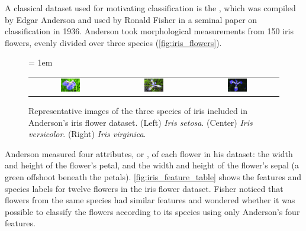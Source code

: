 A classical dataset used for motivating classification is the , which was compiled by Edgar Anderson and used by Ronald Fisher in a seminal paper on classification in 1936. Anderson took morphological measurements from 150 iris flowers, evenly divided over three species (\autoref{fig:iris_flowers}).\\

\begin{figure}[h]
\centering
\tabcolsep = 1em
\mySfFamily
\begin{tabular}{c c c}
\includegraphics[width = 0.25\textwidth]{../images_CMYK/Iris_setosa_2} & \includegraphics[width = 0.25\textwidth]{../images_CMYK/Iris_versicolor} & \includegraphics[width = 0.25\textwidth]{../images_CMYK/Iris_virginica}
\end{tabular}
\caption{Representative images of the three species of iris included in Anderson's iris flower dataset. (Left) \textit{Iris setosa}. (Center)  \textit{Iris versicolor}. (Right) \textit{Iris virginica}.}
\label{fig:iris_flowers}
\end{figure}

Anderson measured four attributes, or , of each flower in his dataset: the width and height of the flower's petal, and the width and height of the flower's sepal (a green offshoot beneath the petals). \autoref{fig:iris_feature_table} shows the features and species labels for twelve flowers in the iris flower dataset. Fisher noticed that flowers from the same species had similar features and wondered whether it was possible to classify the flowers according to its species using only Anderson's four features.\\



